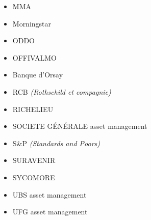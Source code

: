 \begin{itemize}
\item MMA
\item Morningstar
\item ODDO
\item OFFIVALMO
\item Banque d'Orsay
\item RCB \textit{(Rothschild et compagnie)}
\item RICHELIEU
\item SOCIETE GÉNÉRALE asset management
\item S{\&}P \textit{(Standards and Poors)}
\item SURAVENIR
\item SYCOMORE
\item UBS asset management
\item UFG asset management
\end{itemize}
